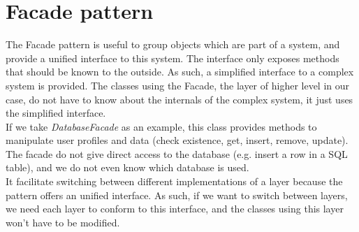 \section{Facade pattern}
The Facade pattern is useful to group objects which are part of a system, and
provide a unified interface to this system. The interface only exposes methods
that should be known to the outside. As such, a simplified interface to a
complex system is provided. The classes using the Facade, the layer of higher
level in our case, do not have to know about the internals of the complex
system, it just uses the simplified interface.\\

If we take \emph{DatabaseFacade} as an example, this class provides methods
to manipulate user profiles and data (check existence, get, insert, remove,
update). The facade do not give direct access to the database
(e.g. insert a row in a SQL table), and we do not even know which database is
used.\\

It facilitate switching between different implementations of a layer because the
pattern offers an unified interface. As such, if we want to switch between
layers, we need each layer to conform to this interface, and the classes using
this layer won't have to be modified.

\newpage
